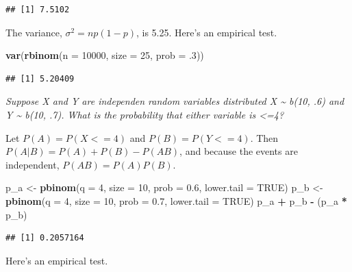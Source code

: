 \documentclass[]{book}
\newenvironment{Shaded}{\begin{snugshade}}{\end{snugshade}}
\newcommand{\DataTypeTok}[1]{\textcolor[rgb]{0.13,0.29,0.53}{#1}}
\newcommand{\DecValTok}[1]{\textcolor[rgb]{0.00,0.00,0.81}{#1}}
\newcommand{\FloatTok}[1]{\textcolor[rgb]{0.00,0.00,0.81}{#1}}
\newcommand{\KeywordTok}[1]{\textcolor[rgb]{0.13,0.29,0.53}{\textbf{#1}}}
\newcommand{\NormalTok}[1]{#1}
\newcommand{\OperatorTok}[1]{\textcolor[rgb]{0.81,0.36,0.00}{\textbf{#1}}}
\newcommand{\OtherTok}[1]{\textcolor[rgb]{0.56,0.35,0.01}{#1}}
\newcommand{\StringTok}[1]{\textcolor[rgb]{0.31,0.60,0.02}{#1}}
\begin{document}
\begin{verbatim}
## [1] 7.5102
\end{verbatim}

The variance, \(\sigma^2 = np (1 - p)\), is 5.25. Here's an empirical test.

\begin{Shaded}
\begin{Highlighting}[]
\KeywordTok{var}\NormalTok{(}\KeywordTok{rbinom}\NormalTok{(}\DataTypeTok{n =} \DecValTok{10000}\NormalTok{, }\DataTypeTok{size =} \DecValTok{25}\NormalTok{, }\DataTypeTok{prob =} \FloatTok{.3}\NormalTok{))}
\end{Highlighting}
\end{Shaded}

\begin{verbatim}
## [1] 5.20409
\end{verbatim}

\emph{Suppose X and Y are independen random variables distributed X \textasciitilde{} b(10, .6) and Y \textasciitilde{} b(10, .7). What is the probability that either variable is \textless=4?}

Let \(P(A) = P(X<=4)\) and \(P(B) = P(Y<=4)\). Then \(P(A|B) = P(A) + P(B) - P(AB)\), and because the events are independent, \(P(AB) = P(A)P(B)\).

\begin{Shaded}
\begin{Highlighting}[]
\NormalTok{p_a <-}\StringTok{ }\KeywordTok{pbinom}\NormalTok{(}\DataTypeTok{q =} \DecValTok{4}\NormalTok{, }\DataTypeTok{size =} \DecValTok{10}\NormalTok{, }\DataTypeTok{prob =} \FloatTok{0.6}\NormalTok{, }\DataTypeTok{lower.tail =} \OtherTok{TRUE}\NormalTok{)}
\NormalTok{p_b <-}\StringTok{ }\KeywordTok{pbinom}\NormalTok{(}\DataTypeTok{q =} \DecValTok{4}\NormalTok{, }\DataTypeTok{size =} \DecValTok{10}\NormalTok{, }\DataTypeTok{prob =} \FloatTok{0.7}\NormalTok{, }\DataTypeTok{lower.tail =} \OtherTok{TRUE}\NormalTok{)}
\NormalTok{p_a }\OperatorTok{+}\StringTok{ }\NormalTok{p_b }\OperatorTok{-}\StringTok{ }\NormalTok{(p_a }\OperatorTok{*}\StringTok{ }\NormalTok{p_b)}
\end{Highlighting}
\end{Shaded}

\begin{verbatim}
## [1] 0.2057164
\end{verbatim}

Here's an empirical test.
\end{document}
